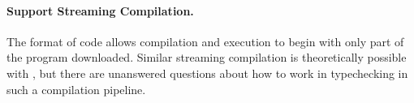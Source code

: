 \paragraph{Support Streaming Compilation.}
The format of \wasm code allows compilation and execution to begin with only part of the program downloaded.
Similar streaming compilation is theoretically possible with \name, but there are unanswered questions about how to work in typechecking in such a compilation pipeline.
